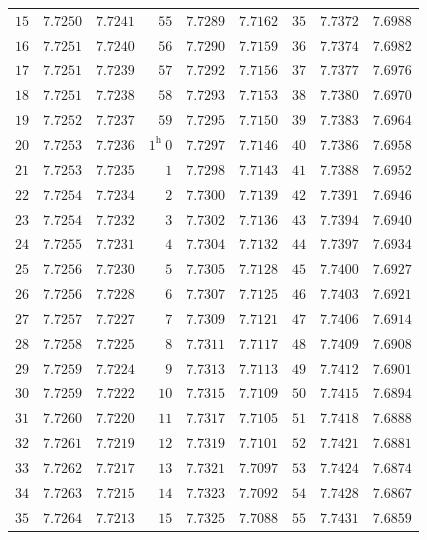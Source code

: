\begin{center}
\begin{tabular}{r|r|r||r|r|r||r|r|r}
$15$ & $7.7250$ & $7.7241$ & $55$ & $7.7289$ & $7.7162$ & $35$ & $7.7372$ & $7.6988$\\
$16$ & $7.7251$ & $7.7240$ & $56$ & $7.7290$ & $7.7159$ & $36$ & $7.7374$ & $7.6982$\\
$17$ & $7.7251$ & $7.7239$ & $57$ & $7.7292$ & $7.7156$ & $37$ & $7.7377$ & $7.6976$\\
$18$ & $7.7251$ & $7.7238$ & $58$ & $7.7293$ & $7.7153$ & $38$ & $7.7380$ & $7.6970$\\
$19$ & $7.7252$ & $7.7237$ & $59$ & $7.7295$ & $7.7150$ & $39$ & $7.7383$ & $7.6964$\\
$20$ & $7.7253$ & $7.7236$ & $1^{\mathrm h}\ 0$ & $7.7297$ & $7.7146$ & $40$ & $7.7386$ & $7.6958$\\
$21$ & $7.7253$ & $7.7235$ & $1$ & $7.7298$ & $7.7143$ & $41$ & $7.7388$ & $7.6952$\\
$22$ & $7.7254$ & $7.7234$ & $2$ & $7.7300$ & $7.7139$ & $42$ & $7.7391$ & $7.6946$\\
$23$ & $7.7254$ & $7.7232$ & $3$ & $7.7302$ & $7.7136$ & $43$ & $7.7394$ & $7.6940$\\
$24$ & $7.7255$ & $7.7231$ & $4$ & $7.7304$ & $7.7132$ & $44$ & $7.7397$ & $7.6934$\\
$25$ & $7.7256$ & $7.7230$ & $5$ & $7.7305$ & $7.7128$ & $45$ & $7.7400$ & $7.6927$\\
$26$ & $7.7256$ & $7.7228$ & $6$ & $7.7307$ & $7.7125$ & $46$ & $7.7403$ & $7.6921$\\
$27$ & $7.7257$ & $7.7227$ & $7$ & $7.7309$ & $7.7121$ & $47$ & $7.7406$ & $7.6914$\\
$28$ & $7.7258$ & $7.7225$ & $8$ & $7.7311$ & $7.7117$ & $48$ & $7.7409$ & $7.6908$\\
$29$ & $7.7259$ & $7.7224$ & $9$ & $7.7313$ & $7.7113$ & $49$ & $7.7412$ & $7.6901$\\
$30$ & $7.7259$ & $7.7222$ & $10$ & $7.7315$ & $7.7109$ & $50$ & $7.7415$ & $7.6894$\\
$31$ & $7.7260$ & $7.7220$ & $11$ & $7.7317$ & $7.7105$ & $51$ & $7.7418$ & $7.6888$\\
$32$ & $7.7261$ & $7.7219$ & $12$ & $7.7319$ & $7.7101$ & $52$ & $7.7421$ & $7.6881$\\
$33$ & $7.7262$ & $7.7217$ & $13$ & $7.7321$ & $7.7097$ & $53$ & $7.7424$ & $7.6874$\\
$34$ & $7.7263$ & $7.7215$ & $14$ & $7.7323$ & $7.7092$ & $54$ & $7.7428$ & $7.6867$\\
$35$ & $7.7264$ & $7.7213$ & $15$ & $7.7325$ & $7.7088$ & $55$ & $7.7431$ & $7.6859$\\

\end{tabular}
\end{center}
